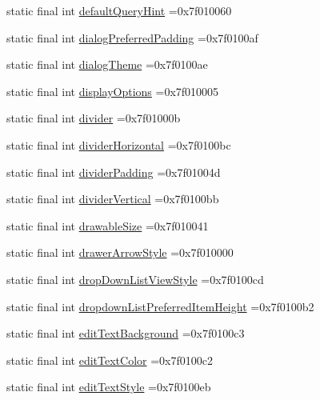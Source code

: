 \begin{DoxyCompactItemize}
\item 
static final int \hyperlink{classcheck_1_1test_1_1_r_1_1attr_a3f57a68c10afd741f6c53c31355e1052}{default\+Query\+Hint} =0x7f010060
\item 
static final int \hyperlink{classcheck_1_1test_1_1_r_1_1attr_aff223408c80429ebea4398db50b9ff36}{dialog\+Preferred\+Padding} =0x7f0100af
\item 
static final int \hyperlink{classcheck_1_1test_1_1_r_1_1attr_a3ea5dd752e953db06c68789665c1627c}{dialog\+Theme} =0x7f0100ae
\item 
static final int \hyperlink{classcheck_1_1test_1_1_r_1_1attr_ab08eeb4f7b4fc4c6f2ef651396d41d99}{display\+Options} =0x7f010005
\item 
static final int \hyperlink{classcheck_1_1test_1_1_r_1_1attr_abda5d171fa2d828b6f8ccf9f4fc707ea}{divider} =0x7f01000b
\item 
static final int \hyperlink{classcheck_1_1test_1_1_r_1_1attr_a0331309a711a60ee0f22b5e718215f7a}{divider\+Horizontal} =0x7f0100bc
\item 
static final int \hyperlink{classcheck_1_1test_1_1_r_1_1attr_a9f8b7dc92e7e2974335ab3d696aa83cf}{divider\+Padding} =0x7f01004d
\item 
static final int \hyperlink{classcheck_1_1test_1_1_r_1_1attr_a64fcf0c48c0723bf9361cd965752e00e}{divider\+Vertical} =0x7f0100bb
\item 
static final int \hyperlink{classcheck_1_1test_1_1_r_1_1attr_a3acddaeb5712641317db75c95a7011af}{drawable\+Size} =0x7f010041
\item 
static final int \hyperlink{classcheck_1_1test_1_1_r_1_1attr_a53bf9b90288295d77d63143853ca2beb}{drawer\+Arrow\+Style} =0x7f010000
\item 
static final int \hyperlink{classcheck_1_1test_1_1_r_1_1attr_a2ab3d3b572318de39593854b08d4e145}{drop\+Down\+List\+View\+Style} =0x7f0100cd
\item 
static final int \hyperlink{classcheck_1_1test_1_1_r_1_1attr_ae7b7ef58aa08b5cd48e82ced09e17dca}{dropdown\+List\+Preferred\+Item\+Height} =0x7f0100b2
\item 
static final int \hyperlink{classcheck_1_1test_1_1_r_1_1attr_a730ff093ffe34aee1d53f2e640ede7ed}{edit\+Text\+Background} =0x7f0100c3
\item 
static final int \hyperlink{classcheck_1_1test_1_1_r_1_1attr_aad21217d13320c22507aeaf702f94f11}{edit\+Text\+Color} =0x7f0100c2
\item 
static final int \hyperlink{classcheck_1_1test_1_1_r_1_1attr_ac6e9f356d0779026955b5bcf35036f7f}{edit\+Text\+Style} =0x7f0100eb

\end{DoxyCompactItemize}
